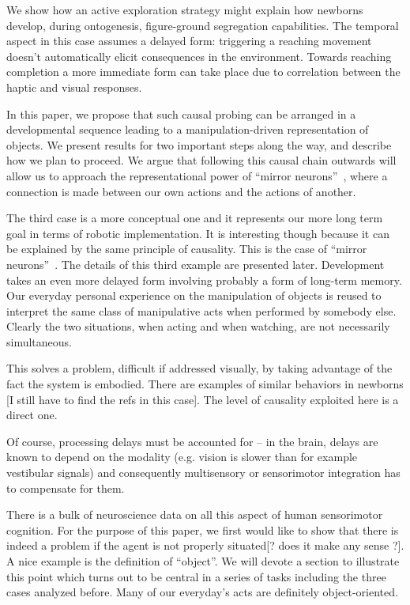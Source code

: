 We
show how an active exploration strategy might explain how newborns
develop, during ontogenesis, figure-ground segregation capabilities.
The temporal aspect in this case assumes a delayed form: triggering a
reaching movement doesn't automatically elicit consequences in the
environment. Towards reaching completion a more immediate form can
take place due to correlation between the haptic and visual responses.
\fi


In this paper, we propose that such causal probing can be arranged in
a developmental sequence leading to a manipulation-driven
representation of objects.  We present results for two important
steps along the way, and describe how we plan to proceed.
We argue that following this causal chain outwards will allow
us to approach the representational power of ``mirror
neurons''~\cite{fadiga00visuomotor}, where a connection is made
between our own actions and the actions of another.

\ifverbose
The third case is a more conceptual one and it represents our more long
term goal in terms of robotic implementation. It is interesting though
because it can be explained by the same principle of causality. This
is the case of ``mirror neurons''~\cite{fadiga00visuomotor}. The
details of this third example are presented later.  Development takes
an even more delayed form involving probably a form of long-term
memory. Our everyday personal experience on the manipulation of objects is
reused to interpret the same class of manipulative acts when performed
by somebody else.  Clearly the two situations, when acting and when watching,
 are not necessarily simultaneous.
\fi

\ifverbose
This solves a problem,
difficult if addressed visually, by taking advantage of the fact the
system is embodied.  There are examples of similar behaviors in
newborns [I still have to find the refs in this case]. The level of
causality exploited here is a direct one. 
\fi

\ifverbose
  Of
course, processing delays must be accounted for -- in the brain,
delays are known to depend on the modality (e.g. vision is slower than
for example vestibular signals) and consequently multisensory or
sensorimotor integration has to compensate for them.
\fi



\ifverbose
There is a bulk of neuroscience data on all this aspect of human
sensorimotor cognition. For the purpose of this paper, we first would
like to show that there is indeed a problem if the agent is not
properly situated[? does it make any sense ?]. A nice example is the
definition of ``object''.  We will devote a
section to illustrate this point which turns out to be central in a
series of tasks including the three cases analyzed before. Many of our everyday's
acts are definitely object-oriented.

